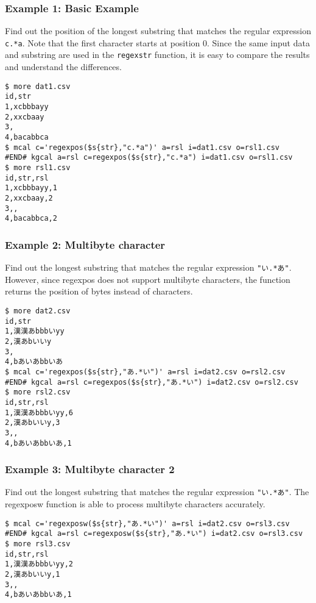 \subsubsection*{Example 1: Basic Example}

Find out the position of the longest substring that matches the regular expression \verb|c.*a|. Note that the first character starts at position 0. Since the same input data and substring are used in the \verb|regexstr| function, it is easy to compare the results and understand the differences.


\begin{Verbatim}[baselinestretch=0.7,frame=single]
$ more dat1.csv
id,str
1,xcbbbayy
2,xxcbaay
3,
4,bacabbca
$ mcal c='regexpos($s{str},"c.*a")' a=rsl i=dat1.csv o=rsl1.csv
#END# kgcal a=rsl c=regexpos($s{str},"c.*a") i=dat1.csv o=rsl1.csv
$ more rsl1.csv
id,str,rsl
1,xcbbbayy,1
2,xxcbaay,2
3,,
4,bacabbca,2
\end{Verbatim}
\subsubsection*{Example 2: Multibyte character}

Find out the longest substring that matches the regular expression \verb|"い.*あ"|. However, since regexpos does not support multibyte characters, the function returns the position of bytes instead of characters.


\begin{Verbatim}[baselinestretch=0.7,frame=single]
$ more dat2.csv
id,str
1,漢漢あbbbいyy
2,漢あbいいy
3,
4,bあいあbbいあ
$ mcal c='regexpos($s{str},"あ.*い")' a=rsl i=dat2.csv o=rsl2.csv
#END# kgcal a=rsl c=regexpos($s{str},"あ.*い") i=dat2.csv o=rsl2.csv
$ more rsl2.csv
id,str,rsl
1,漢漢あbbbいyy,6
2,漢あbいいy,3
3,,
4,bあいあbbいあ,1
\end{Verbatim}
\subsubsection*{Example 3: Multibyte character 2}

Find out the longest substring that matches the regular expression \verb|"い.*あ"|. The regexposw function is able to process multibyte characters accurately.


\begin{Verbatim}[baselinestretch=0.7,frame=single]
$ mcal c='regexposw($s{str},"あ.*い")' a=rsl i=dat2.csv o=rsl3.csv
#END# kgcal a=rsl c=regexposw($s{str},"あ.*い") i=dat2.csv o=rsl3.csv
$ more rsl3.csv
id,str,rsl
1,漢漢あbbbいyy,2
2,漢あbいいy,1
3,,
4,bあいあbbいあ,1
\end{Verbatim}
